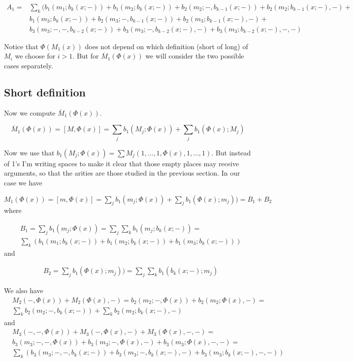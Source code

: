 \documentclass[twoside]{article}
\begin{document}
\begin{align*}
A_1=&\sum_k ( b_1(m_1;b_k(x;-))+b_1(m_2;b_k(x;-))+b_2(m_2;-,b_{k-1}(x;-))+b_2(m_2;b_{k-1}(x;-),-)+\\
&b_1(m_3;b_k(x;-))+b_2(m_3;-,b_{k-1}(x;-))+b_2(m_3;b_{k-1}(x;-),-)+\\
& b_3(m_3;-,-,b_{k-2}(x;-))+b_3(m_3;-,b_{k-2}(x;-),-)+b_3(m_3;b_{k-2}(x;-),-,-)
\end{align*}


Notice that $\Phi(M_1(x))$ does not depend on which definition (short of long) of $M_i$ we choose for $i>1$. But for $\overline{M}_1(\Phi(x))$ we will consider the two possible cases separately.

\subsection{Short definition}

Now we compute $\overline{M}_1(\Phi(x))$.

$$\overline{M}_1(\Phi(x))=[M,\Phi(x)]=\sum_j b_1(M_j;\Phi(x))+\sum_j b_1(\Phi(x);M_j)$$

Now we use that $b_1(M_j;\Phi(x))=\sum M_j(1,\dots, 1,\Phi(x),1,\dots, 1)$. But instead of 1's I'm writing spaces to make it clear that those empty places may receive arguments, so that the arities are those studied in the previous section. In our case we have

$
M_1(\Phi(x))=[m,\Phi(x)]=\sum_j b_1(m_j;\Phi(x))+\sum_j b_1(\Phi(x);m_j))=B_1+B_2
$
where

\begin{align*}
&B_1=\sum_j b_1(m_j;\Phi(x))=\sum_j\sum_k b_1(m_j;b_k(x;-))=\\
&\sum_k(b_1(m_1;b_k(x;-))+b_1(m_2;b_k(x;-))+b_1(m_3;b_k(x;-)))
\end{align*}
and

\begin{align*}
&B_2=\sum_j b_1(\Phi(x);m_j))=\sum_j\sum_k b_1(b_k(x;-);m_j)
\end{align*}

We also have
\begin{align*}
&M_2(-,\Phi(x))+M_2(\Phi(x),-)=b_2(m_2;-,\Phi(x))+b_2(m_2;\Phi(x),-)=\\
&\sum_k b_2(m_2; -,b_k(x;-))+\sum_k b_2(m_2;b_k(x;-),-)
\end{align*}
and
\begin{align*}
&M_3(-,-,\Phi(x))+M_3(-,\Phi(x),-)+M_3(\Phi(x),-,-)=\\
&b_3(m_3;-,-,\Phi(x))+b_3(m_3;-,\Phi(x),-)+b_3(m_3;\Phi(x),-,-)=\\
&\sum_k (b_3(m_3; -,-,b_k(x;-))+ b_3(m_3;-,b_k(x;-),-)+b_3(m_3;b_k(x;-),-,-))
\end{align*}
\end{document}
